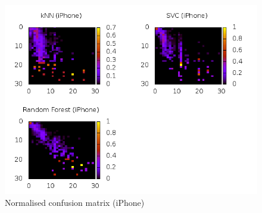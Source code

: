 \begin{figure}
\centering
\includegraphics[scale=0.55]{images/plots/machine_learning/iphone/conf_mat_iphone.png}
\caption{Normalised confusion matrix (iPhone)}
\label{crowdsourcing_desc_length}
\end{figure}

